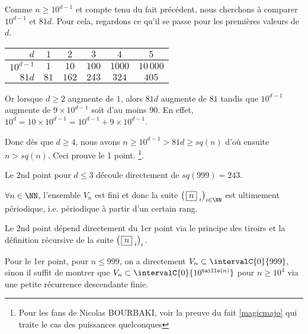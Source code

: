 \begin{proof*}
    Comme $n \geqslant 10^{d-1}$ et compte tenu du fait précédent, nous cherchons à comparer $10^{d-1}$ et $81d$.
    Pour cela, regardons ce qu'il se passe pour les premières valeurs de $d$.

    \smallskip
    \begin{center}
        \begin{tabular}{|r|c|c|c|c|c|}
            \hline
                $d$        & $1$  & $2$   & $3$   & $4$    & $5$        \\
            \hline
                $10^{d-1}$ & $1$  & $10$  & $100$ & $1000$ & $10\,000$  \\
            \hline
                $81d$      & $81$ & $162$ & $243$ & $324$  & $405$      \\
            \hline
        \end{tabular}
    \end{center}
    \smallskip

    Or lorsque $d \geqslant 2$ augmente de $1$, alors $81d$ augmente de $81$ tandis que $10^{d-1}$ augmente de $9\times10^{d-1}$ soit d'au moins $90$.
    En effet, $10^d = 10 \times 10^{d-1} = 10^{d-1} + 9 \times 10^{d-1}$.


    \smallskip

    Donc dès que $d \geqslant 4$, nous avons $n \geqslant 10^{d-1} > 81d \geqslant sq(n)$ d'où ensuite $n > sq(n)$.
    Ceci prouve le 1\ier{} point.
    \footnote{
        Pour les fans de Nicolas BOURBAKI, voir la preuve  du fait \ref{magicmajo} qui traite le cas des puissances quelconques
    }.


    \bigskip

    Le 2nd point pour $d \leqslant 3$ découle directement de $sq(999) = 243$.
\end{proof*}




\medskip

\begin{fact}
    $\forall n \in \NN$, l'ensemble $V_n$ est fini et donc la suite $\left( \, \sqseq{n}{i} \right)_{i \in \NN}$ est ultimement périodique, i.e. périodique à partir d'un certain rang.
\end{fact}

\begin{proof*}
    Le 2nd point dépend directement du 1er point via le principe des tiroirs et la définition récursive de la suite $\left( \, \fbox{$n$}_{\,\,i} \right)_i$.

    \medskip

    Pour le 1er point, pour $n \leqslant 999$, on a directement $V_n \subset \intervalC{0}{999}$,
    sinon il suffit de montrer que $V_n \subset \intervalC{0}{10^{\taille(n)}}$ pour $n \geqslant 10^4$ via une petite récurrence descendante finie.
\end{proof*}

